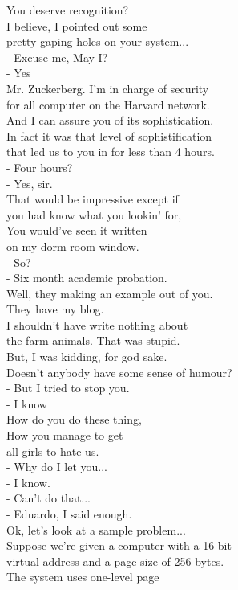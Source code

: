 \documentclass{article}
\begin{document}
\begin{multicols}{3}
You deserve recognition?\\
I believe, I pointed out some\\
pretty gaping holes on your system...\\
- Excuse me, May I?\\
- Yes\\
Mr. Zuckerberg. I'm in charge of security\\
for all computer on the Harvard network.\\
And I can assure you of its sophistication.\\
In fact it was that level of sophistification\\
that led us to you in for less than 4 hours.\\
- Four hours?\\
- Yes, sir.\\
That would be impressive except if\\
you had know what you lookin' for,\\
You would've seen it written\\
on my dorm room window.\\
- So?\\
- Six month academic probation.\\
Well, they making an example out of you.\\
They have my blog.\\
I shouldn't have write nothing about\\
the farm animals. That was stupid.\\
But, I was kidding, for god sake.\\
Doesn't anybody have some sense of humour?\\
- But I tried to stop you.\\
- I know\\
How do you do these thing,\\
How you manage to get\\
all girls to hate us.\\
- Why do I let you...\\
- I know.\\
- Can't do that...\\
- Eduardo, I said enough.\\
Ok, let's look at a sample problem...\\
Suppose we're given a computer with a 16-bit\\
virtual address and a page size of 256 bytes.\\
The system uses one-level page\\

\end{multicols}
\end{document}

